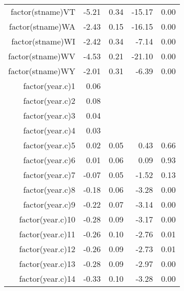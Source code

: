 \begin{table}[ht]
\begin{tabular}{rrrrr}
  factor(stname)VT & -5.21 & 0.34 & -15.17 & 0.00 \\ 
  factor(stname)WA & -2.43 & 0.15 & -16.15 & 0.00 \\ 
  factor(stname)WI & -2.42 & 0.34 & -7.14 & 0.00 \\ 
  factor(stname)WV & -4.53 & 0.21 & -21.10 & 0.00 \\ 
  factor(stname)WY & -2.01 & 0.31 & -6.39 & 0.00 \\ 
  factor(year.c)1 & 0.06 &  &  &  \\ 
  factor(year.c)2 & 0.08 &  &  &  \\ 
  factor(year.c)3 & 0.04 &  &  &  \\ 
  factor(year.c)4 & 0.03 &  &  &  \\ 
  factor(year.c)5 & 0.02 & 0.05 & 0.43 & 0.66 \\ 
  factor(year.c)6 & 0.01 & 0.06 & 0.09 & 0.93 \\ 
  factor(year.c)7 & -0.07 & 0.05 & -1.52 & 0.13 \\ 
  factor(year.c)8 & -0.18 & 0.06 & -3.28 & 0.00 \\ 
  factor(year.c)9 & -0.22 & 0.07 & -3.14 & 0.00 \\ 
  factor(year.c)10 & -0.28 & 0.09 & -3.17 & 0.00 \\ 
  factor(year.c)11 & -0.26 & 0.10 & -2.76 & 0.01 \\ 
  factor(year.c)12 & -0.26 & 0.09 & -2.73 & 0.01 \\ 
  factor(year.c)13 & -0.28 & 0.09 & -2.97 & 0.00 \\ 
  factor(year.c)14 & -0.33 & 0.10 & -3.28 & 0.00 \\ 
   \hline
\end{tabular}
\end{table}
